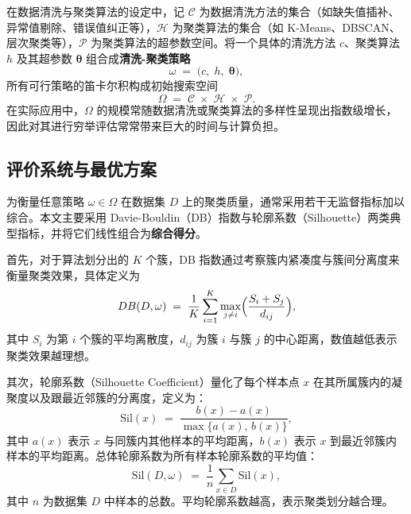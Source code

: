 \documentclass[10pt]{article} %
\numberwithin{equation}{section}
\begin{document}
在数据清洗与聚类算法的设定中，记 \(\mathcal{C}\) 为数据清洗方法的集合（如缺失值插补、异常值剔除、错误值纠正等），\(\mathcal{H}\) 为聚类算法的集合（如 K-Means、DBSCAN、层次聚类等），\(\mathcal{P}\) 为聚类算法的超参数空间。将一个具体的清洗方法 \(c\)、聚类算法 \(h\) 及其超参数 \(\boldsymbol{\theta}\) 组合成\textbf{清洗-聚类策略}
\begin{equation}\label{eq:omega}
  \omega 
  \;=\; 
  \bigl(c,\; h,\; \boldsymbol{\theta}\bigr),
\end{equation}
所有可行策略的笛卡尔积构成初始搜索空间
\begin{equation}\label{eq:Omega}
  \Omega 
  \;=\; 
  \mathcal{C} \;\times\; \mathcal{H} \;\times\; \mathcal{P}.
\end{equation}
在实际应用中，\(\Omega\) 的规模常随数据清洗或聚类算法的多样性呈现出指数级增长，因此对其进行穷举评估常常带来巨大的时间与计算负担。

\subsection{评价系统与最优方案}
\label{subsec:evaluation-system}

为衡量任意策略 \(\omega \in \Omega\) 在数据集 \(D\) 上的聚类质量，通常采用若干无监督指标加以综合。本文主要采用 Davie-Bouldin（DB）指数与轮廓系数（Silhouette）两类典型指标，并将它们线性组合为\textbf{综合得分}。

首先，对于算法划分出的 \(K\) 个簇，DB 指数通过考察簇内紧凑度与簇间分离度来衡量聚类效果，具体定义为
\begin{equation}\label{eq:db-score}
  DB(D,\omega)
  \;=\;
  \frac{1}{K}\sum_{i=1}^{K}
  \max_{j\neq i}
  \Bigl(\frac{S_i + S_j}{d_{ij}}\Bigr),
\end{equation}
其中 \(S_i\) 为第 \(i\) 个簇的平均离散度，\(d_{ij}\) 为簇 \(i\) 与簇 \(j\) 的中心距离，数值越低表示聚类效果越理想。

其次，轮廓系数（Silhouette Coefficient）量化了每个样本点 \(x\) 在其所属簇内的凝聚度以及跟最近邻簇的分离度，定义为：
\begin{equation}\label{eq:silhouette}
  \mathrm{Sil}(x)
  \;=\;
  \frac{b(x) - a(x)}{\max\bigl\{a(x),\,b(x)\bigr\}},
\end{equation}
其中 \(a(x)\) 表示 \(x\) 与同簇内其他样本的平均距离，\(b(x)\) 表示 \(x\) 到最近邻簇内样本的平均距离。总体轮廓系数为所有样本轮廓系数的平均值：
\begin{equation}\label{eq:average-silhouette}
  \mathrm{Sil}(D,\omega)
  \;=\;
  \frac{1}{n} \sum_{x \in D} \mathrm{Sil}(x),
\end{equation}
其中 \(n\) 为数据集 \(D\) 中样本的总数。平均轮廓系数越高，表示聚类划分越合理。
\end{document}
